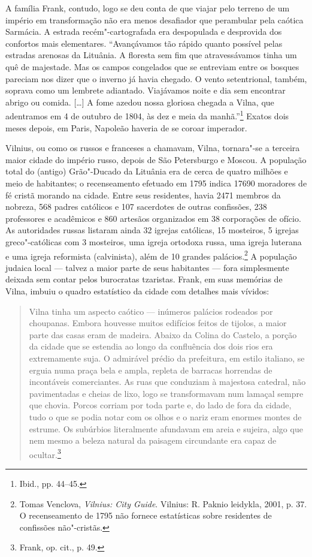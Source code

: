 A família Frank, contudo, logo se deu conta de que viajar pelo terreno
de um império em transformação não era menos desafiador que perambular
pela caótica Sarmácia. A estrada recém"-cartografada era despopulada e
desprovida dos confortos mais elementares. ``Avançávamos tão rápido
quanto possível pelas estradas arenosas da Lituânia. A floresta sem fim
que atravessávamos tinha um quê de majestade. Mas os campos congelados
que se entreviam entre os bosques pareciam nos dizer que o inverno já
havia chegado. O vento setentrional, também, soprava como um lembrete
adiantado. Viajávamos noite e dia sem encontrar abrigo ou comida.
{[}\ldots{}{]} A fome azedou nossa gloriosa chegada a Vilna, que
adentramos em 4 de outubro de 1804, às dez e meia da manhã.''\footnote{Ibid.,
  pp. 44--45.} Exatos dois meses depois, em Paris, Napoleão haveria de se
coroar imperador.

Vilnius, ou como os russos e franceses a chamavam, Vilna, tornara"-se a
terceira maior cidade do império russo, depois de São Petersburgo e
Moscou. A população total do (antigo) Grão"-Ducado da Lituânia era de
cerca de quatro milhões e meio de habitantes; o recenseamento efetuado
em 1795 indica 17690 moradores de fé cristã morando na cidade. Entre
seus residentes, havia 2471 membros da nobreza, 568 padres católicos e
107 sacerdotes de outras confissões, 238 professores e acadêmicos e 860
artesãos organizados em 38 corporações de ofício. As autoridades russas
listaram ainda 32 igrejas católicas, 15 mosteiros, 5 igrejas
greco"-católicas com 3 mosteiros, uma igreja ortodoxa russa, uma igreja
luterana e uma igreja reformista (calvinista), além de 10 grandes
palácios.\footnote{Tomas Venclova, \emph{Vilnius: City Guide}. Vilnius:
  R. Paknio leidykla, 2001, p. 37. O recenseamento de 1795 não fornece
  estatísticas sobre residentes de confissões não"-cristãs.} A população
judaica local --- talvez a maior parte de seus habitantes --- fora
simplesmente deixada sem contar pelos burocratas tzaristas. Frank, em
suas memórias de Vilna, imbuiu o quadro estatístico da cidade com
detalhes mais vívidos:

\begin{quote}
Vilna tinha um aspecto caótico --- inúmeros palácios rodeados por
choupanas. Embora houvesse muitos edifícios feitos de tijolos, a maior
parte das casas eram de madeira. Abaixo da Colina do Castelo, a porção
da cidade que se estendia ao longo da confluência dos dois rios era
extremamente suja. O admirável prédio da prefeitura, em estilo italiano,
se erguia numa praça bela e ampla, repleta de barracas horrendas de
incontáveis comerciantes. As ruas que conduziam à majestosa catedral,
não pavimentadas e cheias de lixo, logo se transformavam num lamaçal
sempre que chovia. Porcos corriam por toda parte e, do lado de fora da
cidade, tudo o que se podia notar com os olhos e o nariz eram enormes
montes de estrume. Os subúrbios literalmente afundavam em areia e
sujeira, algo que nem mesmo a beleza natural da paisagem circundante era
capaz de ocultar.\footnote{Frank, op. cit., p. 49.}
\end{quote}

